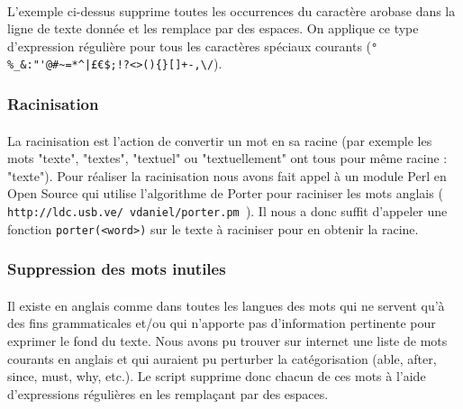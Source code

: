 \paragraph{}
L'exemple ci-dessus supprime toutes les occurrences du caractère arobase dans la ligne de texte donnée et les remplace par des espaces. On applique ce type d'expression régulière pour tous les caractères spéciaux courants (\verb.°%_&:"'@#~=*^|£€$;!?<>(){}[]+-,\/.).

\subsubsection{Racinisation}
\paragraph{}
La racinisation est l'action de convertir un mot en sa racine (par exemple les mots "texte", "textes", "textuel" ou "textuellement" ont tous pour même racine : "texte"). Pour réaliser la racinisation nous avons fait appel à un module Perl en Open Source qui utilise l'algorithme de Porter pour raciniser les mots anglais (\texttt{ http://ldc.usb.ve/~vdaniel/porter.pm }). Il nous a donc suffit d'appeler une fonction \texttt{porter(<word>)} sur le texte à raciniser pour en obtenir la racine.

\subsubsection{Suppression des mots inutiles}
\paragraph{}
Il existe en anglais comme dans toutes les langues des mots qui ne servent qu'à des fins grammaticales et/ou qui n'apporte pas d'information pertinente pour exprimer le fond du texte. Nous avons pu trouver sur internet une liste de mots courants en anglais et qui auraient pu perturber la catégorisation (able, after, since, must, why, etc.). Le script supprime donc chacun de ces mots à l'aide d'expressions régulières en les remplaçant par des espaces.